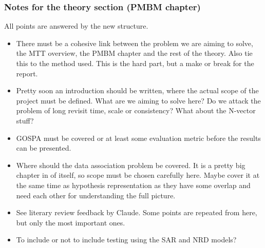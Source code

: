 \subsubsection{Notes for the theory section (PMBM chapter)}
All points are answered by the new structure.
\begin{itemize}
    \item There must be a cohesive link between the problem we are aiming to solve, the MTT overview, the PMBM chapter and the rest of the theory. Also tie this to the method used. This is the hard part, but a make or break for the report.
    \item Pretty soon an introduction should be written, where the actual scope of the project must be defined. What are we aiming to solve here? Do we attack the problem of long revisit time, scale or consistency? What about the N-vector stuff?
    \item GOSPA must be covered or at least some evaluation metric before the results can be presented.
    \item Where should the data association problem be covered. It is a pretty big chapter in of itself, so scope must be chosen carefully here. Maybe cover it at the same time as hypothesis representation as they have some overlap and need each other for understanding the full picture.
    \item See literary review feedback by Claude. Some points are repeated from here, but only the most important ones.
    \item To include or not to include testing using the SAR and NRD models?
\end{itemize}
